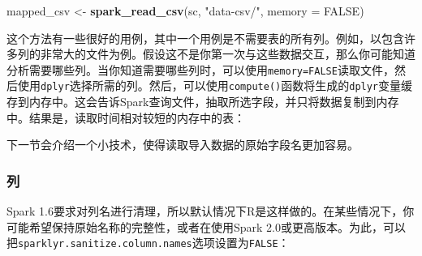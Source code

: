\documentclass[
]{article}
\newenvironment{Shaded}{\begin{snugshade}}{\end{snugshade}}
\newcommand{\DataTypeTok}[1]{\textcolor[rgb]{0.13,0.29,0.53}{#1}}
\newcommand{\KeywordTok}[1]{\textcolor[rgb]{0.13,0.29,0.53}{\textbf{#1}}}
\newcommand{\NormalTok}[1]{#1}
\newcommand{\OperatorTok}[1]{\textcolor[rgb]{0.81,0.36,0.00}{\textbf{#1}}}
\newcommand{\OtherTok}[1]{\textcolor[rgb]{0.56,0.35,0.01}{#1}}
\newcommand{\StringTok}[1]{\textcolor[rgb]{0.31,0.60,0.02}{#1}}
\begin{document}
\begin{Shaded}
\begin{Highlighting}[]
\NormalTok{mapped_csv <-}\StringTok{ }\KeywordTok{spark_read_csv}\NormalTok{(sc, }\StringTok{"data-csv/"}\NormalTok{, }\DataTypeTok{memory =} \OtherTok{FALSE}\NormalTok{)}
\end{Highlighting}
\end{Shaded}

这个方法有一些很好的用例，其中一个用例是不需要表的所有列。例如，以包含许多列的非常大的文件为例。假设这不是你第一次与这些数据交互，那么你可能知道分析需要哪些列。当你知道需要哪些列时，可以使用\texttt{memory=FALSE}读取文件，然后使用\texttt{dplyr}选择所需的列。然后，可以使用\texttt{compute()}函数将生成的\texttt{dplyr}变量缓存到内存中。这会告诉Spark查询文件，抽取所选字段，并只将数据复制到内存中。结果是，读取时间相对较短的内存中的表：

\begin{Shaded}
\end{Shaded}

下一节会介绍一个小技术，使得读取导入数据的原始字段名更加容易。

\hypertarget{ux5217}{%
\subsubsection{列}\label{ux5217}}

Spark
1.6要求对列名进行清理，所以默认情况下R是这样做的。在某些情况下，你可能希望保持原始名称的完整性，或者在使用Spark
2.0或更高版本。为此，可以把\texttt{sparklyr.sanitize.column.names}选项设置为\texttt{FALSE}：
\end{document}
